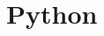 \documentclass[oneside,12pt]{article}
\newcommand{\py}{Python}
\begin{document}
\section{\py}
\cite{pyotkidach,pythink}
\printbibliography
\end{document}
